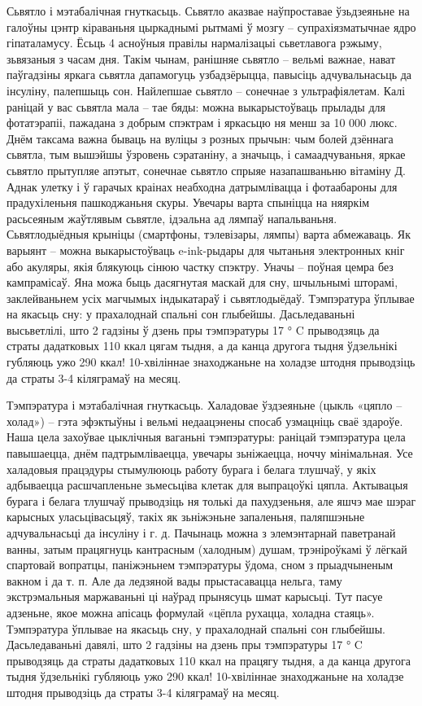 Сьвятло і мэтабалічная гнуткасьць.
Сьвятло аказвае наўпроставае ўзьдзеяньне на галоўны цэнтр кіраваньня цыркаднымі рытмамі ў мозгу – супрахіязматычнае ядро гіпаталамусу. Ёсьць 4 асноўныя правілы нармалізацыі сьветлавога рэжыму, зьвязаныя з часам дня. Такім чынам, ранішняе сьвятло – вельмі важнае, нават паўгадзіны яркага сьвятла дапамогуць узбадзёрыцца, павысіць адчувальнасьць да інсуліну, палепшыць сон. Найлепшае сьвятло – сонечнае з ультрафіялетам. Калі раніцай у вас сьвятла мала – тае бяды: можна выкарыстоўваць прылады для фотатэрапіі, пажадана з добрым спэктрам і яркасьцю ня менш за 10 000 люкс.
Днём таксама важна бываць на вуліцы з розных прычын: чым болей дзённага сьвятла, тым вышэйшы ўзровень сэратаніну, а значыць, і самаадчуваньня, яркае сьвятло прытупляе апэтыт, сонечнае сьвятло спрыяе назапашваньню вітаміну Д. Аднак улетку і ў гарачых краінах неабходна датрымлівацца і фотаабароны для прадухіленьня пашкоджаньня скуры. Увечары варта спыніцца на няяркім расьсеяным жаўтлявым сьвятле, ідэальна ад лямпаў напальваньня. Сьвятлодыёдныя крыніцы (смартфоны, тэлевізары, лямпы) варта абмежаваць. Як варыянт – можна выкарыстоўваць e-ink-рыдары для чытаньня электронных кніг або акуляры, якія блякуюць сінюю частку спэктру. Уначы – поўная цемра без кампрамісаў. Яна можа быць дасягнутая маскай для сну, шчыльнымі шторамі, заклейваньнем усіх магчымых індыкатараў і сьвятлодыёдаў.
Тэмпэратура ўплывае на якасьць сну: у прахалоднай спальні сон глыбейшы. Дасьледаваньні высьветлілі, што 2 гадзіны ў дзень пры тэмпэратуры 17 ° C прыводзяць да страты дадатковых 110 ккал цягам тыдня, а да канца другога тыдня ўдзельнікі губляюць ужо 290 ккал! 10-хвіліннае знаходжаньне на холадзе штодня прыводзіць да страты 3-4 кіляграмаў на месяц.

Тэмпэратура і мэтабалічная гнуткасьць.
Халадовае ўздзеяньне (цыкль «цяпло – холад») – гэта эфэктыўны і вельмі недаацэнены спосаб узмацніць сваё здароўе. Наша цела захоўвае цыклічныя ваганьні тэмпэратуры: раніцай тэмпэратура цела павышаецца, днём падтрымліваецца, увечары зьніжаецца, ноччу мінімальная. Усе халадовыя працэдуры стымулююць работу бурага і белага тлушчаў, у якіх адбываецца расшчапленьне зьмесьціва клетак для выпрацоўкі цяпла. Актывацыя бурага і белага тлушчаў прыводзіць ня толькі да пахудзеньня, але яшчэ мае шэраг карысных уласьцівасьцяў, такіх як зьніжэньне запаленьня, паляпшэньне адчувальнасьці да інсуліну і г. д. Пачынаць можна з элемэнтарнай паветранай ванны, затым працягнуць кантрасным (халодным) душам, трэніроўкамі ў лёгкай спартовай вопратцы, паніжэньнем тэмпэратуры ўдома, сном з прыадчыненым вакном і да т. п. Але да ледзяной вады прыстасавацца нельга, таму экстрэмальныя маржаваньні ці наўрад прынясуць шмат карысьці.
Тут пасуе адзеньне, якое можна апісаць формулай «цёпла рухацца, холадна стаяць». Тэмпэратура ўплывае на якасьць сну, у прахалоднай спальні сон глыбейшы. Дасьледаваньні давялі, што 2 гадзіны на дзень пры тэмпэратуры 17 ° C прыводзяць да страты дадатковых 110 ккал на працягу тыдня, а да канца другога тыдня ўдзельнікі губляюць ужо 290 ккал! 10-хвіліннае знаходжаньне на холадзе штодня прыводзіць да страты 3-4 кіляграмаў на месяц.

